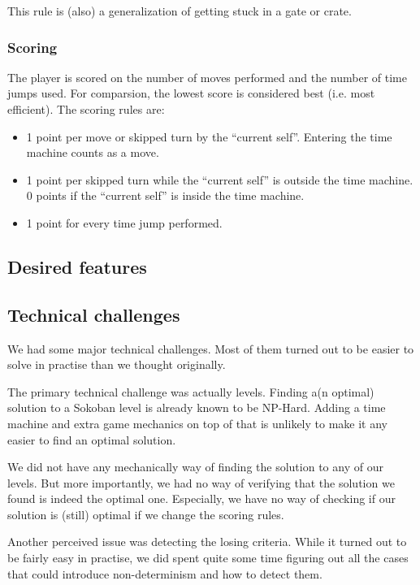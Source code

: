 This rule is (also) a generalization of getting stuck in a gate or
crate.

\subsubsection{Scoring}
The player is scored on the number of moves performed and the number
of time jumps used.  For comparsion, the lowest score is considered
best (i.e. most efficient).  The scoring rules are:

\begin{itemize}
\item 1 point per move or skipped turn by the ``current self''.
  Entering the time machine counts as a move.
\item 1 point per skipped turn while the ``current self'' is outside
  the time machine.  0 points if the ``current self'' is inside the
  time machine.
\item 1 point for every time jump performed.
\end{itemize}

\subsection{Desired features}

\subsection{Technical challenges}
We had some major technical challenges.  Most of them turned out to be
easier to solve in practise than we thought originally.

The primary technical challenge was actually levels.  Finding a(n
optimal) solution to a Sokoban level is already known to be NP-Hard.
Adding a time machine and extra game mechanics on top of that is
unlikely to make it any easier to find an optimal solution.

We did not have any mechanically way of finding the solution to any of
our levels.  But more importantly, we had no way of verifying that the
solution we found is indeed the optimal one.  Especially, we have no
way of checking if our solution is (still) optimal if we change the
scoring rules.

Another perceived issue was detecting the losing criteria.  While it
turned out to be fairly easy in practise, we did spent quite some time
figuring out all the cases that could introduce non-determinism and
how to detect them.

